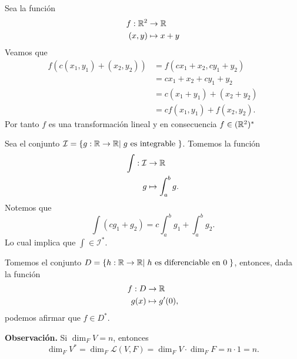 \documentclass[12pt,a4paper]{book}
\newcommand{\llaves}[1]{\{#1\}}
\begin{document}
    \begin{ejemplo}
        Sea la función
        \begin{align*}
            f: \mathbb{R}^2 & \to \mathbb{R}\\
            (x, y) & \mapsto x + y
        \end{align*}
        Veamos que
        \begin{align*}
            f(c(x_1, y_1) + (x_2, y_2)) & = f(cx_1 + x_2, cy_1 + y_2)\\
            & = cx_1 + x_2 + cy_1 + y_2\\
            & = c(x_1 + y_1) + (x_2 + y_2)\\
            & = cf(x_1, y_1) + f(x_2, y_2).
        \end{align*}
        Por tanto $f$ es una transformación lineal y en consecuencia $f \in (\mathbb{R}^2)^{*}$
    \end{ejemplo}

    \begin{ejemplo}
        Sea el conjunto $\mathcal{I}= \llaves{g:\R \to \R |\; g \text{ es integrable }}$. Tomemos la función
        \begin{align*}
            \int: \mathcal{I} & \to \mathbb{R} \\
            g & \mapsto \int_a^bg.
        \end{align*}
        Notemos que 
        \begin{equation*}
            \int(cg_1 + g_2) = c \int_a^bg_1 + \int_a^bg_2.
        \end{equation*}
        Lo cual implica que $\int \in \mathcal{I}^*$.
    \end{ejemplo}

    \vspace{1.6cm}

    \begin{ejemplo}
        Tomemos el conjunto $D = \llaves{h: \R \to \R | \; h \text{ es diferenciable en }0 \;}$, entonces, dada la función
        \begin{align*}
            f: D & \to \mathbb{R}\\
            g(x) & \mapsto g'(0),
        \end{align*}
        podemos afirmar que $f \in D^{*}$.
    \end{ejemplo}


    \textbf{Observación.} Si $\dim_FV = n$, entonces
    \begin{equation*}
        \dim_FV^{*} = \dim_F\mathcal{L}(V, F) = \dim_FV \cdot \dim_FF = n \cdot 1 = n.
    \end{equation*}
\end{document}
